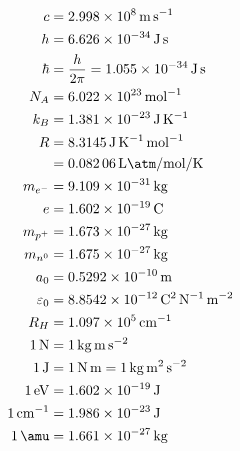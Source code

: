 \begin{align*}
c&= \SI{2.998e8}{\meter\per\second}\\
h&= \SI{6.626e-34}{\joule\second}\\
\hbar &= \frac{h}{2 \pi } = \SI{1.055e-34}{\joule\second}\\
N_A&= \SI{6.022e23}{\per\mole}\\
k_B&= \SI{1.381e-23}{\joule\per\kelvin}\\
R&= \SI{8.3145}{\joule\per\kelvin\per\mole}\\
&= \SI{0.08206}{\liter\atm\per\mole\per\kelvin}\\
m_{e^-}&=\SI{9.109e-31}{\kilo\gram}\\
e &= \SI{1.602e-19}{\coulomb}\\
m_{p^+}&=\SI{1.673e-27}{\kilo\gram}\\
m_{n^0} &= \SI{1.675e-27}{\kilo\gram}\\
a_0 &= \SI{0.5292e-10}{\meter}\\
\varepsilon_0 &= \SI{8.8542e-12}{\coulomb\squared\per\newton\per\meter\squared}\\
R_H&=\SI{1.097e5}{\per\centi\meter}\\
\SI{1}{\newton} &= \SI{1}{\kilo\gram\meter\per\second\squared}\\
\SI{1}{\joule}&= \SI{1}{\newton\meter} = \SI{1}{\kilo\gram\meter\squared\per\second\squared}\\
\SI{1}{\eV}&=\SI{1.602e-19}{\joule}\\
\SI{1}{\per\centi\meter}&=\SI{1.986e-23}{\joule}\\
\SI{1}{\amu} &= \SI{1.661e-27}{\kilo\gram}\\
\end{align*}


